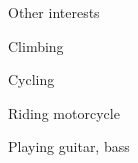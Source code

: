 \documentclass{resume} %
\begin{document}

\begin{rSection}{Other interests}

\item Climbing
\item Cycling
\item Riding motorcycle
\item Playing guitar, bass

\end{rSection}

\end{document}
